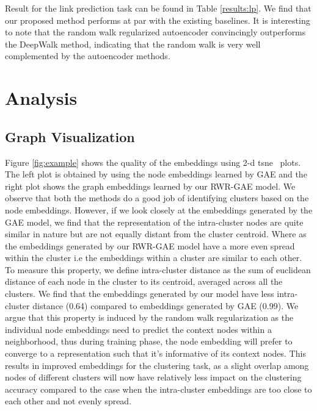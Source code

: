 \documentclass{article}
\begin{document}
Result for the link prediction task can be found in Table \ref{results:lp}. We find that our proposed method performs at par with the existing baselines. It is interesting to note that the random walk regularized autoencoder convincingly outperforms the DeepWalk method, indicating that the random walk is very well complemented by the autoencoder methods.

\section{Analysis}

\subsection{Graph Visualization \label{graph:dis}}
Figure \ref{fig:example} shows the quality of the embeddings using 2-d tsne~\cite{van2014accelerating} plots. The left plot is obtained by using the node embeddings learned by GAE and the right plot shows the graph embeddings learned by our RWR-GAE model. We observe that both the methods do a good job of identifying clusters based on the node embeddings. However, if we look closely at the embeddings generated by the GAE model, we find that the representation of the intra-cluster nodes are quite similar in nature but are not equally distant from the cluster centroid. Where as the embeddings generated by our RWR-GAE model have a more even spread within the cluster i.e the embeddings within a cluster are similar to each other. To measure this property, we define intra-cluster distance as the sum of euclidean distance of each node in the cluster to its centroid, averaged across all the clusters. We find that the embeddings generated by our model have less intra-cluster distance (0.64) compared to embeddings generated by GAE (0.99). We argue that this property is induced by the random walk regularization as the individual node embeddings need to predict the context nodes within a neighborhood, thus during training phase, the node embedding will prefer to converge to a representation such that it's informative of its context nodes. This results in improved embeddings for the clustering task, as a slight overlap among nodes of different clusters will now have relatively less impact on the clustering accuracy compared to the case when the intra-cluster embeddings are too close to each other and not evenly spread.
\end{document}
